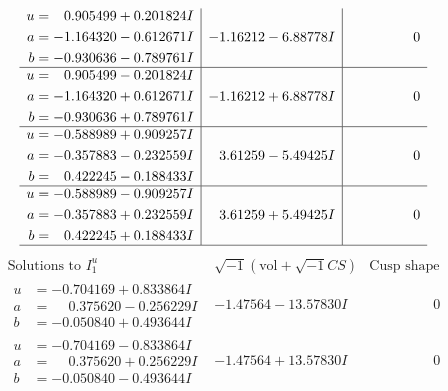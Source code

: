 \documentclass[1p]{elsarticle_modified}
\theoremstyle{definition}
\newcommand{\I}{\sqrt{-1}}
\begin{document}
$$\begin{array}{c|c|c}
\begin{aligned}
u &= \phantom{-}0.905499 + 0.201824 I \\
a &= -1.164320 - 0.612671 I \\
b &= -0.930636 - 0.789761 I\end{aligned}
 & -1.16212 - 6.88778 I & \phantom{-0.000000 } 0 \\ \hline\begin{aligned}
u &= \phantom{-}0.905499 - 0.201824 I \\
a &= -1.164320 + 0.612671 I \\
b &= -0.930636 + 0.789761 I\end{aligned}
 & -1.16212 + 6.88778 I & \phantom{-0.000000 } 0 \\ \hline\begin{aligned}
u &= -0.588989 + 0.909257 I \\
a &= -0.357883 - 0.232559 I \\
b &= \phantom{-}0.422245 - 0.188433 I\end{aligned}
 & \phantom{-}3.61259 - 5.49425 I & \phantom{-0.000000 } 0 \\ \hline\begin{aligned}
u &= -0.588989 - 0.909257 I \\
a &= -0.357883 + 0.232559 I \\
b &= \phantom{-}0.422245 + 0.188433 I\end{aligned}
 & \phantom{-}3.61259 + 5.49425 I & \phantom{-0.000000 } 0\\
 \hline 
 \end{array}$$\newpage$$\begin{array}{c|c|c}  
\text{Solutions to }I^u_{1}& \I (\text{vol} + \sqrt{-1}CS) & \text{Cusp shape}\\
 \hline 
\begin{aligned}
u &= -0.704169 + 0.833864 I \\
a &= \phantom{-}0.375620 - 0.256229 I \\
b &= -0.050840 + 0.493644 I\end{aligned}
 & -1.47564 - 13.57830 I & \phantom{-0.000000 } 0 \\ \hline\begin{aligned}
u &= -0.704169 - 0.833864 I \\
a &= \phantom{-}0.375620 + 0.256229 I \\
b &= -0.050840 - 0.493644 I\end{aligned}
 & -1.47564 + 13.57830 I & \phantom{-0.000000 } 0 \\ \hline\begin{aligned}

\end{aligned}
\end{array}$$
\end{document}
